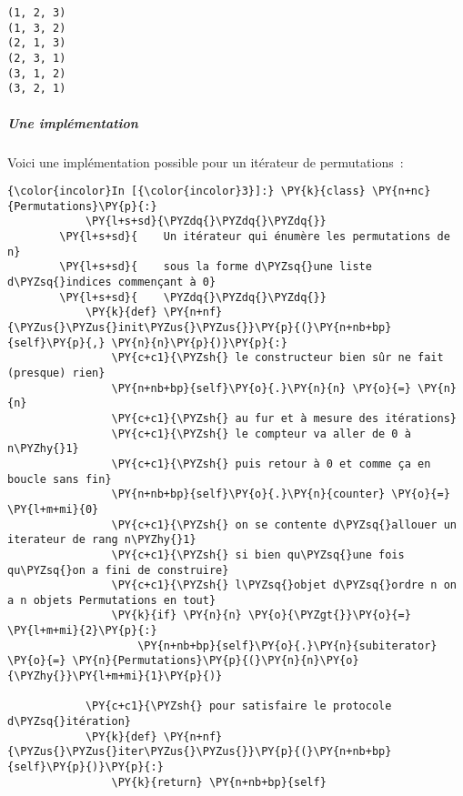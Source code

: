     \begin{Verbatim}[commandchars=\\\{\},frame=single,framerule=0.3mm,rulecolor=\color{cellframecolor}]
(1, 2, 3)
(1, 3, 2)
(2, 1, 3)
(2, 3, 1)
(3, 1, 2)
(3, 2, 1)
\end{Verbatim}

    \hypertarget{une-impluxe9mentation}{%
\subparagraph{Une implémentation}\label{une-impluxe9mentation}}

    Voici une implémentation possible pour un itérateur de permutations~:

    \begin{Verbatim}[commandchars=\\\{\},frame=single,framerule=0.3mm,rulecolor=\color{cellframecolor}]
{\color{incolor}In [{\color{incolor}3}]:} \PY{k}{class} \PY{n+nc}{Permutations}\PY{p}{:}
            \PY{l+s+sd}{\PYZdq{}\PYZdq{}\PYZdq{}}
        \PY{l+s+sd}{    Un itérateur qui énumère les permutations de n}
        \PY{l+s+sd}{    sous la forme d\PYZsq{}une liste d\PYZsq{}indices commençant à 0}
        \PY{l+s+sd}{    \PYZdq{}\PYZdq{}\PYZdq{}}
            \PY{k}{def} \PY{n+nf}{\PYZus{}\PYZus{}init\PYZus{}\PYZus{}}\PY{p}{(}\PY{n+nb+bp}{self}\PY{p}{,} \PY{n}{n}\PY{p}{)}\PY{p}{:}
                \PY{c+c1}{\PYZsh{} le constructeur bien sûr ne fait (presque) rien}
                \PY{n+nb+bp}{self}\PY{o}{.}\PY{n}{n} \PY{o}{=} \PY{n}{n}
                \PY{c+c1}{\PYZsh{} au fur et à mesure des itérations}
                \PY{c+c1}{\PYZsh{} le compteur va aller de 0 à n\PYZhy{}1}
                \PY{c+c1}{\PYZsh{} puis retour à 0 et comme ça en boucle sans fin}
                \PY{n+nb+bp}{self}\PY{o}{.}\PY{n}{counter} \PY{o}{=} \PY{l+m+mi}{0}
                \PY{c+c1}{\PYZsh{} on se contente d\PYZsq{}allouer un iterateur de rang n\PYZhy{}1}
                \PY{c+c1}{\PYZsh{} si bien qu\PYZsq{}une fois qu\PYZsq{}on a fini de construire}
                \PY{c+c1}{\PYZsh{} l\PYZsq{}objet d\PYZsq{}ordre n on a n objets Permutations en tout}
                \PY{k}{if} \PY{n}{n} \PY{o}{\PYZgt{}}\PY{o}{=} \PY{l+m+mi}{2}\PY{p}{:}
                    \PY{n+nb+bp}{self}\PY{o}{.}\PY{n}{subiterator} \PY{o}{=} \PY{n}{Permutations}\PY{p}{(}\PY{n}{n}\PY{o}{\PYZhy{}}\PY{l+m+mi}{1}\PY{p}{)}
        
            \PY{c+c1}{\PYZsh{} pour satisfaire le protocole d\PYZsq{}itération}
            \PY{k}{def} \PY{n+nf}{\PYZus{}\PYZus{}iter\PYZus{}\PYZus{}}\PY{p}{(}\PY{n+nb+bp}{self}\PY{p}{)}\PY{p}{:}
                \PY{k}{return} \PY{n+nb+bp}{self}
        

\end{Verbatim}
